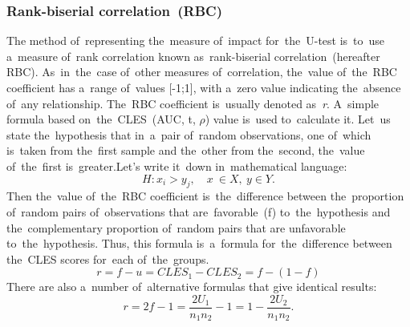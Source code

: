 \documentclass[russian,english]{scrreprt}
\begin{document}
\subsubsection{Rank-biserial correlation~(RBC)}
The method of~representing the~measure of~impact for~the~U-test is~to~use a~measure of~rank correlation known as~rank-biserial correlation~(hereafter RBC). As~in~the~case of~other measures of~correlation, the~value of~the~RBC coefficient has a~range of~values [-1;1], with a~zero value indicating the~absence of~any relationship. The~RBC coefficient is~usually denoted as~\textit{r}. A~simple formula based on~the~CLES~(AUC, t, $\rho$) value is~used to~calculate it. Let~us state the~hypothesis that in~a~pair of~random observations, one of~which is~taken from the~first sample and the~other from the~second, the~value of~the~first is~greater.Let's write it~down in~mathematical language:
\begin{equation}\label{eq:RBC-hypothesis}
H: x_{i} > y_{j}, \quad x \ \in X,\ y \in Y.
\end{equation}
Then the~value of~the~RBC coefficient is~the~difference between the~proportion of~random pairs of~observations that are~favorable~(f) to~the~hypothesis and the~complementary proportion of~random pairs that are unfavorable to~the~hypothesis. Thus, this formula is~a~formula for~the~difference between the~CLES scores for~each of~the~groups.
\begin{equation}\label{eq:RBC-formula-1}
r = f - u = CLES_{1} - CLES_{2} = f - (1 - f)
\end{equation}
There are also a~number of~alternative formulas that give identical results:
\begin{equation}\label{eq:RBC-formula-2}
r = 2f -1 = \frac{2U_{1}}{n_{1}n_{2}}-1 = 1 - \frac{2U_{2}}{n_{1}n_{2}}.
\end{equation}
%
\end{document}
